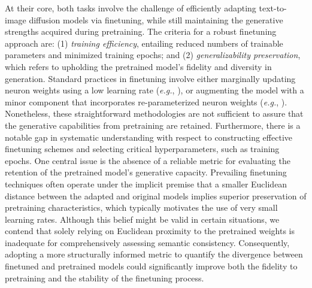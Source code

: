 At their core, both tasks involve the challenge of efficiently adapting text-to-image diffusion models via finetuning, while still maintaining the generative strengths acquired during pretraining. The criteria for a robust finetuning approach are: (1) \emph{training efficiency}, entailing reduced numbers of trainable parameters and minimized training epochs; and (2) \emph{generalizability preservation}, which refers to upholding the pretrained model's fidelity and diversity in generation. Standard practices in finetuning involve either marginally updating neuron weights using a low learning rate (\emph{e.g.}, \cite{ruiz2023dreambooth}), or augmenting the model with a minor component that incorporates re-parameterized neuron weights (\emph{e.g.}, \cite{hulora2022,zhang2023adding}). Nonetheless, these straightforward methodologies are not sufficient to assure that the generative capabilities from pretraining are retained. Furthermore, there is a notable gap in systematic understanding with respect to constructing effective finetuning schemes and selecting critical hyperparameters, such as training epochs. One central issue is the absence of a reliable metric for evaluating the retention of the pretrained model’s generative capacity. Prevailing finetuning techniques often operate under the implicit premise that a smaller Euclidean distance between the adapted and original models implies superior preservation of pretraining characteristics, which typically motivates the use of very small learning rates. Although this belief might be valid in certain situations, we contend that solely relying on Euclidean proximity to the pretrained weights is inadequate for comprehensively assessing semantic consistency. Consequently, adopting a more structurally informed metric to quantify the divergence between finetuned and pretrained models could significantly improve both the fidelity to pretraining and the stability of the finetuning process.

